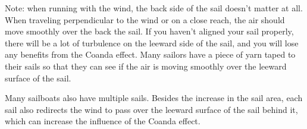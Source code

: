 Note: when running with the wind,  the back side of the sail doesn't matter at all.    When traveling perpendicular to the wind or on a close reach,  the air should move smoothly over the back the sail.   If you haven't aligned your sail properly,  there will be a lot of turbulence on the leeward side of the sail,  and you 
will lose any benefits from the Coanda effect.  Many sailors have a piece of yarn taped to their sails so
that they can see if the air is moving smoothly over the leeward surface of the sail. 

Many sailboats also have multiple sails.  Besides the increase in the sail area,  each sail also redirects the wind to pass over the leeward surface of the sail
behind it, which can increase the influence of the Coanda effect.

